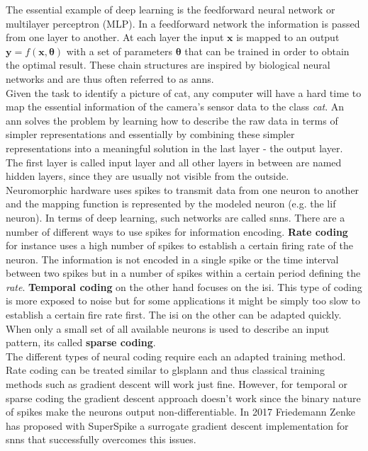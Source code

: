 The essential example of deep learning is the feedforward neural network or multilayer perceptron (MLP). In a feedforward network the information is passed from one layer to another. At each layer the input $\mathbf{x}$ is mapped to an output $\mathbf{y} = f(\mathbf{x, \theta})$ with a set of parameters $\mathbf{\theta}$ that can be trained in order to obtain the optimal result. These chain structures are inspired by biological neural networks and are thus often referred to as \glspl{ann}.\\

Given the task to identify a picture of cat, any computer will have a hard time to map the essential information of the camera's sensor data to the class \textit{cat}. An \gls{ann} solves the problem by learning how to describe the raw data in terms of simpler representations and essentially by combining these simpler representations into a meaningful solution in the last layer - the output layer. The first layer is called input layer and all other layers in between are named hidden layers, since they are usually not visible from the outside.\\

Neuromorphic hardware uses spikes to transmit data from one neuron to another and the mapping function is represented by the modeled neuron (e.g. the \gls{lif} neuron). In terms of deep learning, such networks are called \glspl{snn}. There are a number of different ways to use spikes for information encoding. \textbf{Rate coding} for instance uses a high number of spikes to establish a certain firing rate of the neuron. The information is not encoded in a single spike or the time interval between two spikes but in a number of spikes within a certain period defining the \textit{rate}. \textbf{Temporal coding} on the other hand focuses on the \gls{isi}. This type of coding is more exposed to noise but for some applications it might be simply too slow to establish a certain fire rate first. The \gls{isi} on the other can be adapted quickly. When only a small set of all available neurons is used to describe an input pattern, its called \textbf{sparse coding}.\\

The different types of neural coding require each an adapted training method. Rate coding can be treated similar to glspl{ann} and thus classical training methods such as gradient descent will work just fine. However, for temporal or sparse coding the gradient descent approach doesn't work since the binary nature of spikes make the neurons output non-differentiable. In 2017 Friedemann Zenke has proposed with SuperSpike a surrogate gradient descent implementation for \glspl{snn} that successfully overcomes this issues. 

